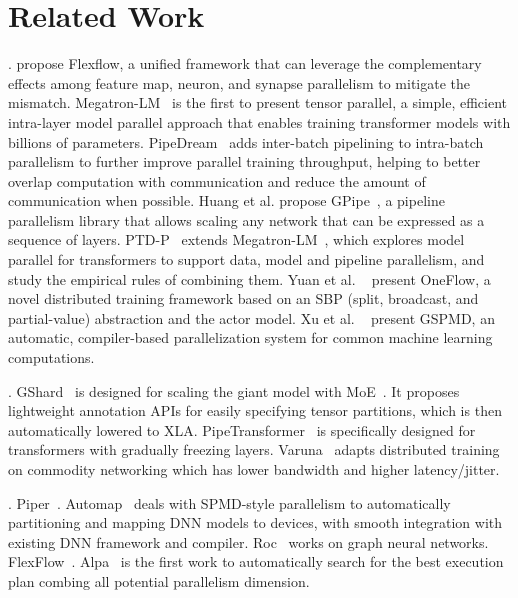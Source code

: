 \section{Related Work}\label{related}


.
\cite{lu2017flexflow} propose Flexflow, a unified framework that can leverage the complementary effects among feature map, neuron, and synapse parallelism to mitigate the mismatch.
Megatron-LM~\cite{shoeybi2019megatron} is the first to present tensor parallel, a simple, efficient intra-layer model parallel approach that enables training transformer models with billions of parameters.
PipeDream~\cite{narayanan2019pipedream} adds inter-batch pipelining to intra-batch parallelism to further improve parallel training throughput, helping to better overlap computation with communication and reduce the amount of communication when possible. 
Huang et al. propose GPipe~\cite{huang2019gpipe}, a pipeline parallelism library that allows scaling any network that can be expressed as a sequence of layers.
PTD-P~\cite{megatron} extends Megatron-LM~\cite{shoeybi2019megatron}, which explores model parallel for transformers to support data, model and pipeline parallelism, and study the empirical rules of combining them.
Yuan et al. ~\cite{yuan2021oneflow} present OneFlow, a novel distributed training framework based on an SBP (split, broadcast, and partial-value) abstraction and the actor model.
Xu et al. ~\cite{xu2021gspmd} present GSPMD, an automatic, compiler-based parallelization system for common machine learning computations.

.
GShard~\cite{lepikhin2020gshard} is designed for scaling the giant model with MoE~\cite{riquelme2021scaling}. It proposes lightweight annotation APIs for easily specifying tensor partitions, which is then automatically lowered to XLA.
PipeTransformer~\cite{he2021pipetransformer} is specifically designed for transformers with gradually freezing layers.
Varuna~\cite{athlur2021varuna} adapts distributed training on commodity networking which has lower bandwidth and higher latency/jitter.

.
Piper~\cite{tarnawski2021piper}.
Automap~\cite{schaarschmidt2021automap} deals with SPMD-style parallelism to automatically partitioning and mapping DNN models to devices, with smooth integration with existing DNN framework and compiler.
Roc~\cite{jia2020improving} works on graph neural networks.
FlexFlow~\cite{jia2019beyond}.
Alpa~\cite{zheng2022alpa} is the first work to automatically search for the best execution plan combing all potential parallelism dimension.

